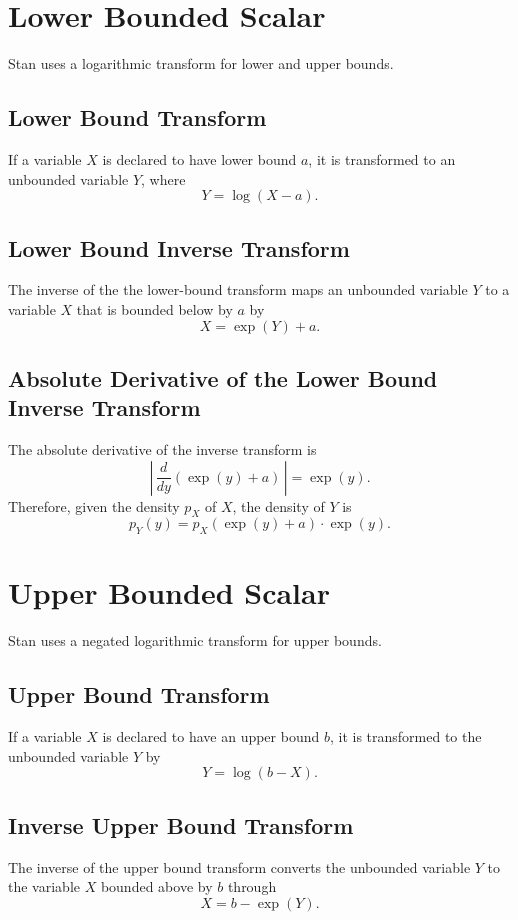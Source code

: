 \documentclass[10pt]{report}
\newcommand{\Stan}{Stan\xspace}
\begin{document}
\section{Lower Bounded Scalar}

\Stan uses a logarithmic transform for lower and upper bounds.  

\subsection{Lower Bound Transform}

If a variable $X$ is declared to have lower bound $a$, it is
transformed to an unbounded variable $Y$, where
%
\[
Y = \log(X - a).
\]

\subsection{Lower Bound Inverse Transform}
%
The inverse of the the lower-bound transform maps an unbounded
variable $Y$ to a variable $X$ that is bounded below by $a$ by
%
\[
X = \exp(Y) + a.
\]

\subsection{Absolute Derivative of the Lower Bound Inverse Transform}

The absolute derivative of the inverse transform is
\[
\left| \,
\frac{d}{dy} \left( \exp(y) + a \right)
\, \right|
= \exp(y).
\]
Therefore, given the density $p_X$ of $X$, the density of $Y$ is 
%
\[
p_Y(y) 
= p_X\!\left( \exp(y) + a \right) \cdot \exp(y).
\]


\section{Upper Bounded Scalar}

\Stan uses a negated logarithmic transform for upper bounds.

\subsection{Upper Bound Transform}

If a variable $X$ is declared to have an upper bound $b$, it is
transformed to the unbounded variable $Y$ by
%
\[
Y = \log(b - X).
\]

\subsection{Inverse Upper Bound Transform}
%
The inverse of the upper bound transform converts the unbounded
variable $Y$ to the variable $X$ bounded above by $b$ through
%
\[
X = b - \exp(Y).
\]
\end{document}
